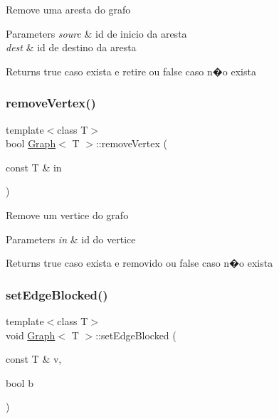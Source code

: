 Remove uma aresta do grafo 
\begin{DoxyParams}{Parameters}
{\em sourc} & id de inicio da aresta \\
\hline
{\em dest} & id de destino da aresta \\
\hline
\end{DoxyParams}
\begin{DoxyReturn}{Returns}
true caso exista e retire ou false caso n�o exista 
\end{DoxyReturn}
\mbox{\label{class_graph_af9c903104ad69a7782979fa9caedf163}} 
\subsubsection{\texorpdfstring{remove\+Vertex()}{removeVertex()}}
{\footnotesize\ttfamily template$<$class T$>$ \\
bool \mbox{\hyperlink{class_graph}{Graph}}$<$ T $>$\+::remove\+Vertex (\begin{DoxyParamCaption}\item[{const T \&}]{in }\end{DoxyParamCaption})}

Remove um vertice do grafo 
\begin{DoxyParams}{Parameters}
{\em in} & id do vertice \\
\hline
\end{DoxyParams}
\begin{DoxyReturn}{Returns}
true caso exista e removido ou false caso n�o exista 
\end{DoxyReturn}
\mbox{\label{class_graph_a338f11555225fc082d5f5777cfd2e01d}} 
\subsubsection{\texorpdfstring{set\+Edge\+Blocked()}{setEdgeBlocked()}}
{\footnotesize\ttfamily template$<$class T$>$ \\
void \mbox{\hyperlink{class_graph}{Graph}}$<$ T $>$\+::set\+Edge\+Blocked (\begin{DoxyParamCaption}\item[{const T \&}]{v,  }\item[{bool}]{b }\end{DoxyParamCaption})}


